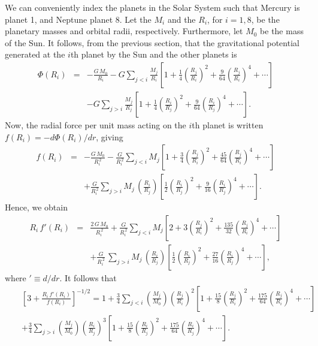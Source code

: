We can conveniently index the planets in the Solar System such that Mercury is planet 1, and Neptune planet 8. Let the $M_i$ and the $R_i$, for $i=1,8$, be the planetary masses and orbital radii, respectively. Furthermore, let $M_0$ be the mass of the Sun.
 It follows, from the previous section, that the gravitational potential generated at the $i$th planet by the Sun and
the other planets is
\begin{eqnarray}
\Phi(R_i) &=& -\frac{G\,M_0}{R_i}-G \sum_{j< i}\frac{M_j}{R_i}\left[1+\frac{1}{4}\left(\frac{R_j}{R_i}\right)^2 + \frac{9}{64}\left(\frac{R_j}{R_i}\right)^4+\cdots\right]\nonumber\\[0.5ex]&&
 -G \sum_{j> i}\frac{M_j}{R_j}\left[1+\frac{1}{4}\left(\frac{R_i}{R_j}\right)^2 + \frac{9}{64}\left(\frac{R_i}{R_j}\right)^4+\cdots\right].
\end{eqnarray}
Now, the radial force per unit mass acting on the $i$th planet is written
$f(R_i) = - d\Phi(R_i)/dr$, giving
\begin{eqnarray}
f(R_i) &=& -\frac{G\,M_0}{R_i^{\,2}}-\frac{G}{R_i^{\,2}} \sum_{j< i}M_j\left[1+\frac{3}{4}\left(\frac{R_j}{R_i}\right)^2
+ \frac{45}{64}\left(\frac{R_j}{R_i}\right)^4 +\cdots\right]\nonumber\\[0.5ex]&&
 +\frac{G}{R_i^{\,2}} \sum_{j> i}M_j\,\left(\frac{R_i}{R_j}\right)\!\left[\frac{1}{2}\left(\frac{R_i}{R_j}\right)^2+ \frac{9}{16}\left(\frac{R_i}{R_j}\right)^4+\cdots\right].
\end{eqnarray}
Hence, we obtain
\begin{eqnarray}
R_i\,f'(R_i) &=& \frac{2\,G\,M_0}{R_i^{\,2}}+\frac{G}{R_i^{\,2}} \sum_{j< i}M_j\left[2+3\left(\frac{R_j}{R_i}\right)^2
+ \frac{135}{32}\left(\frac{R_j}{R_i}\right)^4+\cdots\right]\nonumber\\[0.5ex]&&
 + \frac{G}{R_i^{\,2}}\,\sum_{j> i}M_j\,\left(\frac{R_i}{R_j}\right)\!\left[\frac{1}{2}\left(\frac{R_i}{R_j}\right)^2+ \frac{27}{16}\left(\frac{R_i}{R_j}\right)^4+\cdots\right],
 \end{eqnarray}
where $'\equiv d/dr$. It follows that
\begin{eqnarray}
&&\left[3 + \frac{R_i\,f'(R_i)}{f(R_i)}\right]^{-1/2} =1 + \frac{3}{4}\sum_{j<i}\left(\frac{M_j}{M_0}\right)
\left(\frac{R_j}{R_i}\right)^2\left[1 + \frac{15}{8}\left(\frac{R_j}{R_i}\right)^2 + \frac{175}{64}\left(\frac{R_j}{R_i}
\right)^4+\cdots\right]\nonumber\\[0.5ex]&&+ \frac{3}{4}\sum_{j>i}\left(\frac{M_j}{M_0}\right)
\left(\frac{R_i}{R_j}\right)^3\left[1 + \frac{15}{8}\left(\frac{R_i}{R_j}\right)^2 + \frac{175}{64}\left(\frac{R_i}{R_j}
\right)^4+\cdots\right].
\end{eqnarray}
